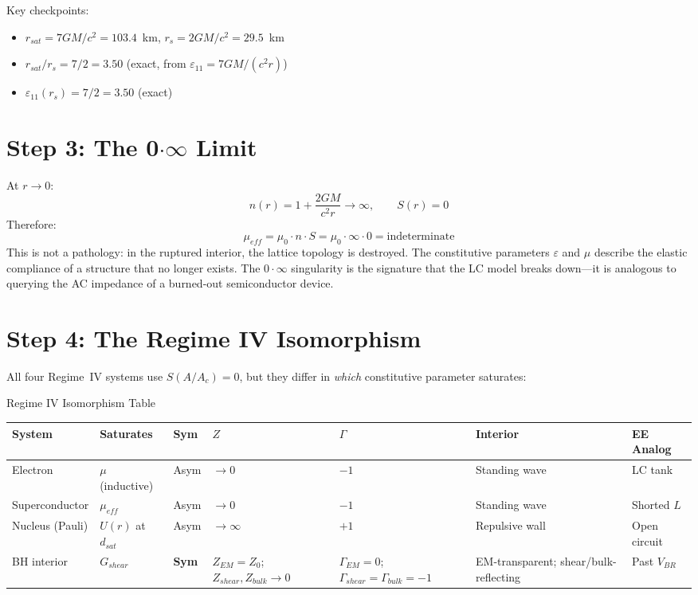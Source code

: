 \noindent Key checkpoints:
\begin{itemize}
    \item $r_{sat} = 7GM/c^2 = 103.4$~km, $r_s = 2GM/c^2 = 29.5$~km
    \item $r_{sat}/r_s = 7/2 = 3.50$ (exact, from $\varepsilon_{11} = 7GM/(c^2 r)$)
    \item $\varepsilon_{11}(r_s) = 7/2 = 3.50$ (exact)
\end{itemize}

\section{Step 3: The 0$\cdot\infty$ Limit}

At $r \to 0$:
\begin{equation}
    n(r) = 1 + \frac{2GM}{c^2 r} \to \infty, \qquad S(r) = 0
\end{equation}
Therefore:
\begin{equation}
    \mu_{eff} = \mu_0 \cdot n \cdot S = \mu_0 \cdot \infty \cdot 0
    = \text{indeterminate}
\end{equation}
This is not a pathology: in the ruptured interior, the lattice topology is destroyed.
The constitutive parameters $\varepsilon$ and $\mu$ describe the elastic compliance
of a structure that no longer exists. The $0 \cdot \infty$ singularity
is the signature that the LC model breaks down---it is analogous
to querying the AC impedance of a burned-out semiconductor device.

\section{Step 4: The Regime IV Isomorphism}

All four Regime~IV systems use $S(A/A_c) = 0$, but they differ
in \textit{which} constitutive parameter saturates:

\begin{resultbox}{Regime IV Isomorphism Table}
\begin{center}
\begin{tabularx}{\textwidth}{@{}lll>{\centering\arraybackslash}X>{\centering\arraybackslash}X>{\centering\arraybackslash}XX@{}}
\toprule
\textbf{System} & \textbf{Saturates} & \textbf{Sym} & $Z$ & $\Gamma$ & \textbf{Interior} & \textbf{EE Analog} \\
\midrule
Electron          & $\mu$ (inductive) & Asym & $\to 0$   & $-1$ & Standing wave & LC tank \\
Superconductor    & $\mu_{eff}$       & Asym & $\to 0$   & $-1$ & Standing wave & Shorted $L$ \\
Nucleus (Pauli)   & $U(r)$ at $d_{sat}$ & Asym & $\to\infty$ & $+1$ & Repulsive wall & Open circuit \\
BH interior       & $G_{shear}$       & \textbf{Sym}  & $Z_{EM}{=}Z_0$; $Z_{shear},Z_{bulk}{\to}0$   & $\Gamma_{EM}{=}0$; $\Gamma_{shear}{=}\Gamma_{bulk}{=}{-}1$  & EM-transparent; shear/bulk-reflecting & Past $V_{BR}$ \\
\bottomrule
\end{tabularx}
\end{center}
\end{resultbox}

